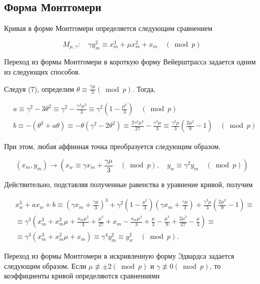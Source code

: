 \subsection{Форма Монтгомери}

Кривая в форме Монтгомери определяется следующим сравнением~\cite{montgomery-curve}

$$
M_{\mu, \gamma}: \quad \gamma y_{m}^{2} \equiv x_{m}^{3}+\mu x_{m}^{2}+x_{m} \quad(\bmod p)
$$

Переход из формы Монтгомери в короткую форму Вейерштрасса задается одним из следующих способов.

Следуя (7), определим $\theta \equiv \frac{\gamma \mu}{3}(\bmod p)$. Тогда,

$$
\begin{aligned}
& a \equiv \gamma^{2}-3 \theta^{2} \equiv \gamma^{2}-\frac{\gamma^{2} \mu^{2}}{3} \equiv \gamma^{2}\left(1-\frac{\mu^{2}}{3}\right) \quad(\bmod p) \\
& b \equiv-\left(\theta^{3}+a \theta\right) \equiv-\theta\left(\gamma^{2}-2 \theta^{2}\right) \equiv \frac{2 \gamma^{3} \mu^{3}}{27}-\frac{\gamma^{3} \mu}{3} \equiv \frac{\gamma^{3} \mu}{3}\left(\frac{2 \mu^{2}}{9}-1\right) \quad(\bmod p)
\end{aligned}
$$

При этом, любая аффинная точка преобразуется следующим образом.

$$
\left(x_{m}, y_{m}\right) \rightarrow\left(x_{w} \equiv \gamma x_{m}+\frac{\gamma \mu}{3} \quad(\bmod p), \quad y_{w} \equiv \gamma^{2} y_{m} \quad(\bmod p)\right)
$$

Действительно, подставляя полученные равенства в уравнение кривой, получим

$$
\begin{aligned}
& x_{w}^{3}+a x_{w}+b \equiv\left(\gamma x_{m}+\frac{\gamma \mu}{3}\right)^{3}+\gamma^{2}\left(1-\frac{\mu^{2}}{3}\right)\left(\gamma x_{m}+\frac{\gamma \mu}{3}\right)+\frac{\gamma^{3} \mu}{3}\left(\frac{2 \mu^{2}}{9}-1\right) \equiv \\
& \equiv \gamma^{3}\left(x_{m}^{3}+x_{m}^{2} \mu+\frac{x_{m} \mu^{2}}{3}+\frac{\mu^{3}}{27}+x_{m}-\frac{x_{m} \mu^{2}}{3}+\frac{\mu}{3}-\frac{\mu^{3}}{9}+\frac{2 \mu^{3}}{27}-\frac{\mu}{3}\right) \equiv \\
& \equiv \gamma^{3}\left(x_{m}^{3}+x_{m}^{2} \mu+x_{m}\right) \equiv \gamma^{4} y_{m}^{2} \equiv y_{w}^{2} \quad(\bmod p) .
\end{aligned}
$$

Переход из формы Монтгомери в искривленную форму Эдвардса задается следующим образом. Если $\mu \not \equiv \pm 2(\bmod p)$ и $\gamma \not \equiv 0(\bmod p)$, то коэффициенты кривой определяются сравнениями

